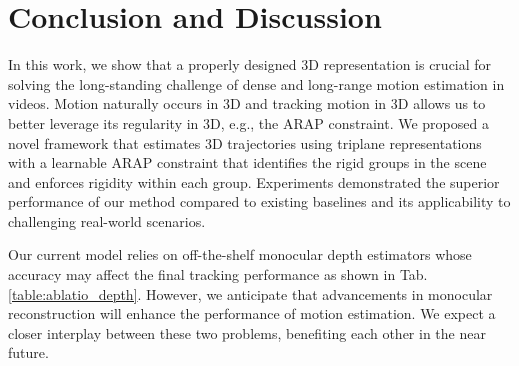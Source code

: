 \section{Conclusion and Discussion}\label{sec:conclusion}

In this work, we show that a properly designed 3D representation is crucial for solving the long-standing challenge of dense and long-range motion estimation in videos. Motion naturally occurs in 3D and tracking motion in 3D allows us to better leverage its regularity in 3D, e.g., the ARAP constraint. We proposed a novel framework that estimates 3D trajectories using triplane representations with a learnable ARAP constraint that identifies the rigid groups in the scene and enforces rigidity within each group. Experiments demonstrated the superior performance of our method compared to existing baselines and its applicability to challenging real-world scenarios. 

Our current model relies on off-the-shelf monocular depth estimators whose accuracy may affect the final tracking performance as shown in Tab. \ref{table:ablatio_depth}. However, we anticipate that advancements in monocular reconstruction will enhance the performance of motion estimation. We expect a closer interplay between these two problems, benefiting each other in the near future.


